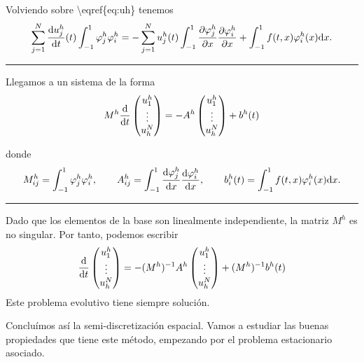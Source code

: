Volviendo sobre \textbackslash eqref\{eq:uh\} tenemos \[
    \sum_{j=1}^N \frac{\mathrm{d} u_j^h}{\mathrm{d} t} (t) \int_{-1}^1 \varphi_j^h \varphi_i^h
    = - \sum_{j=1}^N u_j^h(t) \int_{-1}^1 \frac{\partial \varphi_j^h}{\partial x} \frac{\partial \varphi_i^h}{\partial x}
    + \int_{-1}^1 f(t,x) \varphi_i^h (x) \mathrm{d} x.
\]

\begin{center}\rule{0.5\linewidth}{0.5pt}\end{center}

Llegamos a un sistema de la forma \[
    M^h
    \frac{\mathrm{d} }{\mathrm{d} t}
    \begin{pmatrix} u_1^h \\ \vdots \\ u^N_h \end{pmatrix}
    = -
    A^h
    \begin{pmatrix} u_1^h \\ \vdots \\ u^N_h \end{pmatrix}
    +
    b^h (t)
\]



donde \[
    M^h_{ij} = \int_{-1}^1 \varphi_j^h \varphi_i^h ,
    \qquad A_{ij}^h = \int_{-1}^1 \frac{\mathrm{d} \varphi_j^h}{\mathrm{d} x} \frac{\mathrm{d} \varphi_i^h}{\mathrm{d} x},
    \qquad b_i^h (t) = \int_{-1}^1 f(t,x) \varphi_i^h (x) \mathrm{d} x .
\]

\begin{center}\rule{0.5\linewidth}{0.5pt}\end{center}

Dado que los elementos de la base son linealmente independiente, la
matriz \(M^h\) es no singular. Por tanto, podemos escribir \[
    \frac{\mathrm{d} }{\mathrm{d} t}
    \begin{pmatrix} u_1^h \\ \vdots \\ u^N_h \end{pmatrix}
    = -
    (M^h)^{-1} A^h
    \begin{pmatrix} u_1^h \\ \vdots \\ u^N_h \end{pmatrix}
    +
    (M^h)^{-1} b^h(t)
\] Este problema evolutivo tiene siempre solución.



Concluímos así la semi-discretización espacial. Vamos a estudiar las
buenas propiedades que tiene este método, empezando por el problema
estacionario asociado.

